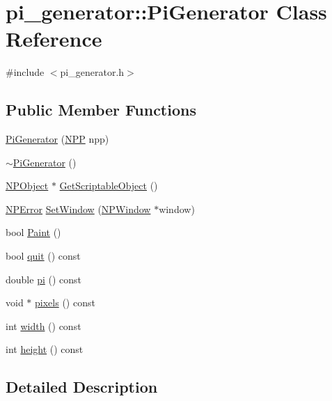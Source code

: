\hypertarget{classpi__generator_1_1_pi_generator}{
\section{pi\_\-generator::PiGenerator Class Reference}
\label{classpi__generator_1_1_pi_generator}
}


{\ttfamily \#include $<$pi\_\-generator.h$>$}

\subsection*{Public Member Functions}
\begin{DoxyCompactItemize}
\item 
\hyperlink{classpi__generator_1_1_pi_generator_a0f5a55bbb942dee1b185447f0a7e24be}{PiGenerator} (\hyperlink{struct___n_p_p}{NPP} npp)
\item 
\hyperlink{classpi__generator_1_1_pi_generator_ac7d9c07492fd86678b8f66643e1e8c1e}{$\sim$PiGenerator} ()
\item 
\hyperlink{struct_n_p_object}{NPObject} $\ast$ \hyperlink{classpi__generator_1_1_pi_generator_ac65f31616ae3d223bdc01b91aea91762}{GetScriptableObject} ()
\item 
\hyperlink{npapi_8h_a56715bc92ac93f0447a05f852ce18828}{NPError} \hyperlink{classpi__generator_1_1_pi_generator_ad19c9de44971a5c08ee8e26a45598f38}{SetWindow} (\hyperlink{struct___n_p_window}{NPWindow} $\ast$window)
\item 
bool \hyperlink{classpi__generator_1_1_pi_generator_a47540afa1d21ef0b6e6ea7d986b71243}{Paint} ()
\item 
bool \hyperlink{classpi__generator_1_1_pi_generator_a02e8796485d878cbe8a42dcc2b204c4a}{quit} () const 
\item 
double \hyperlink{classpi__generator_1_1_pi_generator_a74119d27c1a01b50b91677f8089a0103}{pi} () const 
\item 
void $\ast$ \hyperlink{classpi__generator_1_1_pi_generator_a3e4279bb7732861b21ab6d1dcfc27429}{pixels} () const 
\item 
int \hyperlink{classpi__generator_1_1_pi_generator_ae3b2d276f4cf6209d7653f6fc4437fc4}{width} () const 
\item 
int \hyperlink{classpi__generator_1_1_pi_generator_a7cdc6f6c02a01a63e813c8357e901fb9}{height} () const 
\end{DoxyCompactItemize}


\subsection{Detailed Description}


